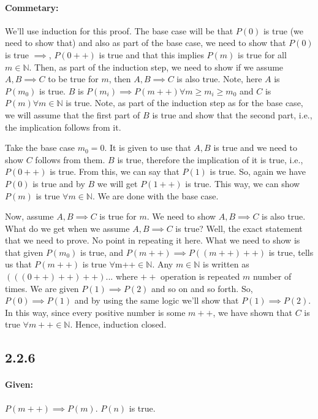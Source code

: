 \documentclass{report}
\begin{document}
\paragraph{Commetary: } We'll use induction for this proof. The base case will be that $P(0)$ is true (we need to show that) and also as part of the base case, we need to show that $P(0)$ is true $\implies$, $P(0++)$ is true and that this implies $P(m)$ is true for all $m \in \mathbb{N}$. Then, as part of the induction step, we need to show if we assume  $A,B \implies C$ to be true for  $m$, then  $A,B \implies C$ is also true. Note, here $A$ is  $P(m_0)$ is true.  $B$ is $P(m_i) \implies P(m++) \forall m \ge m_i \ge m_0$ and $C$ is  $P(m) \forall m \in \mathbb{N}$ is true. Note, as part of the induction step as for the base case, we will assume that the first part of $B$ is true and show that the second part, i.e., the implication follows from it.

Take the base case $m_0 = 0$. It is given to use that $A, B$ is true and we need to show  $C$ follows from them. $B$ is true, therefore the implication of it is true, i.e.,  $P(0++)$ is true. From this, we can say that $P(1)$ is true. So, again we have $P(0)$ is true and by $B$ we will get $P(1++)$ is true. This way, we can show $P(m)$ is true $\forall m \in \mathbb{N}$. We are done with the base case.


Now, assume  $A,B \implies C$ is true for  $m$. We need to show  $A,B \implies C$ is also true. What do we get when we assume $A, B \implies C$ is true? Well, the exact statement that we need to prove. No point in repeating it here. What we need to show is that given  $P(m_0)$ is true, and $P(m++) \implies P((m++)++)$ is true, tells us that $P(m++)$ is true $\forall $m++$ \in \mathbb{N}$.
Any $m \in \mathbb{N}$  is written as $(((0++)++)++)...$ where  $++$ operation is repeated  $m$ number of times. We are given $P(1) \implies P(2)$ and so on and so forth. So, $P(0) \implies P(1)$ and by using the same logic we'll show that $P(1) \implies P(2)$. In this way, since every positive number is some  $m++$, we have shown that $C$ is true  $\forall m++ \in \mathbb{N}$. Hence, induction closed. 

\subsection*{2.2.6}
\paragraph{Given: } $P(m++) \implies P(m)$.  $P(n)$ is true.
\end{document}
